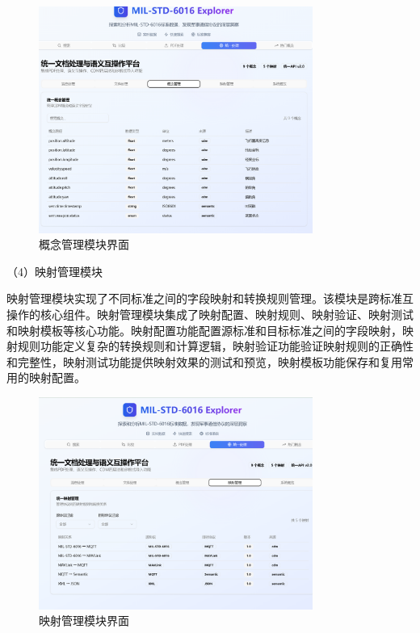 \begin{figure}[H]
\centering
\includegraphics[width=0.8\textwidth]{chapters/fig-0/front_concept.png}
\caption{概念管理模块界面}
\label{fig:frontend-concept}
\end{figure}

（4）映射管理模块

映射管理模块实现了不同标准之间的字段映射和转换规则管理。该模块是跨标准互操作的核心组件。映射管理模块集成了映射配置、映射规则、映射验证、映射测试和映射模板等核心功能。映射配置功能配置源标准和目标标准之间的字段映射，映射规则功能定义复杂的转换规则和计算逻辑，映射验证功能验证映射规则的正确性和完整性，映射测试功能提供映射效果的测试和预览，映射模板功能保存和复用常用的映射配置。

\begin{figure}[H]
\centering
\includegraphics[width=0.8\textwidth]{chapters/fig-0/front_project.png}
\caption{映射管理模块界面}
\label{fig:frontend-mapping}
\end{figure}

